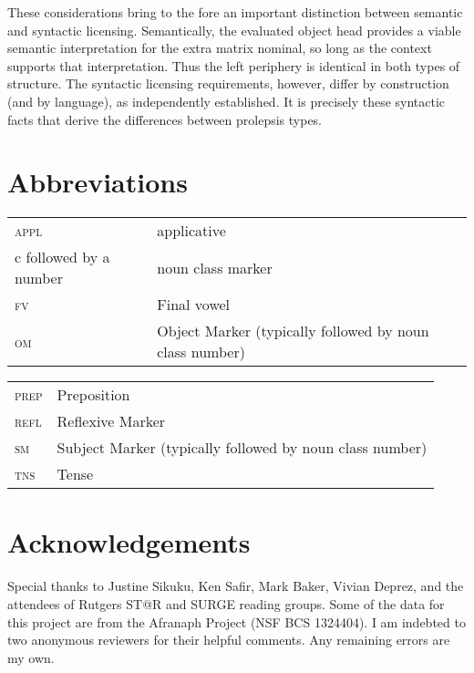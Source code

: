 \documentclass[output=paper,colorlinks,citecolor=brown]{langscibook}
\begin{document}
These considerations bring to the fore an important distinction between semantic and syntactic licensing. Semantically, the evaluated object head provides a viable semantic interpretation for the extra matrix nominal, so long as the context supports that interpretation. Thus the left periphery is identical in both types of structure. The syntactic licensing requirements, however, differ by construction (and by language), as independently established. It is precisely these syntactic facts that derive the differences between prolepsis types.

\section*{Abbreviations}
\begin{tabularx}{.45\textwidth}{QQ}
{\textsc{appl}}  &  applicative\\
 {c} followed by a number  &  noun class marker\\
 {\textsc{fv}}  &  Final vowel\\
 {\textsc{om}}  &  Object Marker (typically followed by noun class number)\\
 \end{tabularx}
\begin{tabularx}{.45\textwidth}{lQ}
 {\textsc{prep}}  &  Preposition\\
 {\textsc{refl}}  &  Reflexive Marker\\
 {\textsc{sm}}  &  Subject Marker (typically followed by noun class number)\\
 {\textsc{tns}}  &  Tense
\end{tabularx}


\section*{Acknowledgements}
Special thanks to Justine Sikuku, Ken Safir, Mark Baker, Vivian Deprez, and the attendees of Rutgers ST@R and SURGE reading groups. Some of the data for this project are from the Afranaph Project (NSF BCS 1324404). I am indebted to two anonymous reviewers for their helpful comments. Any remaining errors are my own.%

\nocite{SafirSikuku2011}
\printbibliography[heading=subbibliography,notkeyword=this]
\end{document}
